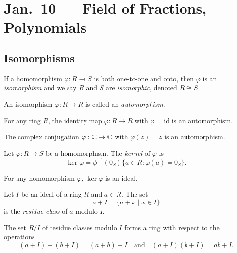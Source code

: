 \chapter{Jan.~10 --- Field of Fractions, Polynomials}

\section{Isomorphisms}
\begin{definition}[Isomorphism]
If a homomorphism $\varphi : R \to S$ is both one-to-one
and onto,
then $\varphi$ is an \emph{isomorphism} and we say $R$
and $S$ are \emph{isomorphic}, denoted
$R \cong S$.
\end{definition}

\begin{definition}[Automorphism]
  An isomorphism $\varphi : R \to R$ is called an
  \emph{automorphism}.
\end{definition}

\begin{example}
  For any ring $R$, the identity map $\varphi : R \to R$
  with $\varphi = \text{id}$ is an automorphism.
\end{example}

\begin{exercise}
  The complex conjugation $\varphi : \mathbb{C} \to \mathbb{C}$
  with $\varphi(z) = \overline{z}$ is an automorphism.
\end{exercise}

\begin{definition}[Kernel]
  Let $\varphi : R \to S$ be a homomorphism. The
  \emph{kernel} of $\varphi$ is
  \[
    \ker \varphi = \phi^{-1}(0_S) \{ a \in R : \varphi(a) = 0_S \}.
  \]
\end{definition}

\begin{exercise}
  For any homomorphism $\varphi$, $\ker \varphi$ is
  an ideal.
\end{exercise}

\begin{definition}
  Let $I$ be an ideal of a ring $R$ and $a \in R$.
  The set
  \[a + I = \{a + x \mid x \in I\}\]
  is the \emph{residue class} of $a$ modulo $I$.
\end{definition}

\begin{exercise}
  The set $R / I$ of residue classes modulo $I$ forms
  a ring with respect to the operations
  \[(a + I) + (b + I) = (a + b) + I \quad \text{and} \quad (a + I)(b + I) = ab + I.\]
\end{exercise}

